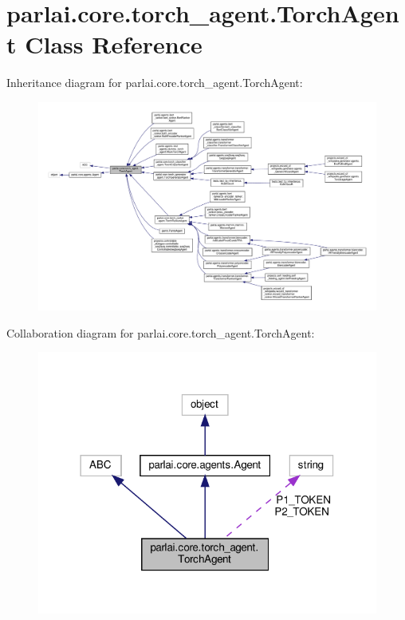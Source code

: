 \hypertarget{classparlai_1_1core_1_1torch__agent_1_1TorchAgent}{}\section{parlai.\+core.\+torch\+\_\+agent.\+Torch\+Agent Class Reference}
\label{classparlai_1_1core_1_1torch__agent_1_1TorchAgent}


Inheritance diagram for parlai.\+core.\+torch\+\_\+agent.\+Torch\+Agent\+:
\nopagebreak
\begin{figure}[H]
\begin{center}
\leavevmode
\includegraphics[width=350pt]{d0/d92/classparlai_1_1core_1_1torch__agent_1_1TorchAgent__inherit__graph}
\end{center}
\end{figure}


Collaboration diagram for parlai.\+core.\+torch\+\_\+agent.\+Torch\+Agent\+:
\nopagebreak
\begin{figure}[H]
\begin{center}
\leavevmode
\includegraphics[width=318pt]{d2/d85/classparlai_1_1core_1_1torch__agent_1_1TorchAgent__coll__graph}
\end{center}
\end{figure}
